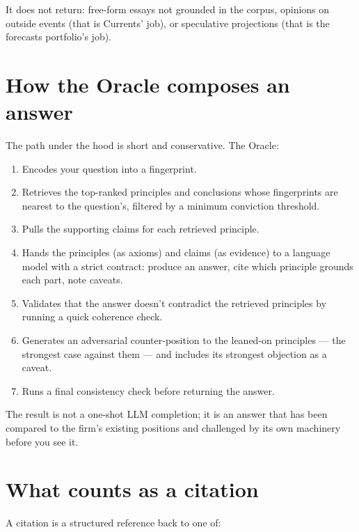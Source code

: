 \documentclass[11pt]{article}
\begin{document}
It does not return: free-form essays not grounded in the corpus,
opinions on outside events (that is Currents' job), or speculative
projections (that is the forecasts portfolio's job).


\section{How the Oracle composes an answer}

The path under the hood is short and conservative. The Oracle:

\begin{enumerate}[leftmargin=*,itemsep=0.2em]
  \item Encodes your question into a fingerprint.
  \item Retrieves the top-ranked principles and conclusions whose
        fingerprints are nearest to the question's, filtered by a
        minimum conviction threshold.
  \item Pulls the supporting claims for each retrieved principle.
  \item Hands the principles (as axioms) and claims (as evidence) to
        a language model with a strict contract: produce an answer,
        cite which principle grounds each part, note caveats.
  \item Validates that the answer doesn't contradict the retrieved
        principles by running a quick coherence check.
  \item Generates an adversarial counter-position to the leaned-on
        principles --- the strongest case against them --- and
        includes its strongest objection as a caveat.
  \item Runs a final consistency check before returning the answer.
\end{enumerate}

The result is not a one-shot LLM completion; it is an answer that has
been compared to the firm's existing positions and challenged by its
own machinery before you see it.

\section{What counts as a citation}

A citation is a structured reference back to one of:
\end{document}
